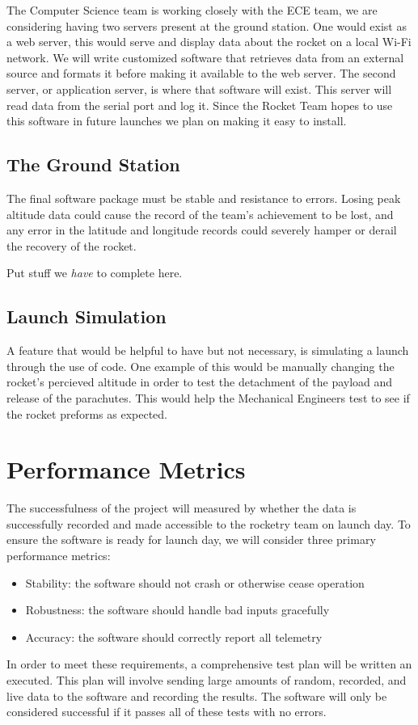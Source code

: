 \documentclass[10pt,journal,draftclsnofoot,onecolumn]{IEEEtran}
\begin{document}
The Computer Science team is 
working closely with the ECE team, we are considering having two servers 
present at the ground station. One would exist as a web server, this would
serve and display data about the rocket on a local Wi-Fi network. We will
write customized software that retrieves data from an external source and
formats it before making it available to the web server. The second server,
 or application server, is where that software will exist. This server will
 read data from the serial port and log it. Since the Rocket Team hopes to 
 use this software in future launches we plan on making it easy to install.

\subsection{The Ground Station}

The final software package must be stable and resistance to errors.
Losing peak altitude data could cause the record of the team's
achievement to be lost, and any error in the latitude
and longitude records could severely hamper or derail
the recovery of the rocket.


Put stuff we \textit{have} to complete here.

\subsection{Launch Simulation}

A feature that would be helpful to have but not necessary, is simulating a launch
through the use of code. One example of this would be manually changing the rocket's 
percieved altitude in order to test the detachment of the payload and release of the
parachutes. This would help the Mechanical Engineers test to see if 
the rocket preforms as expected. 

\section{Performance Metrics}

The successfulness of the project will measured by whether the data
is successfully recorded and made accessible to the rocketry team
on launch day. To ensure the software is ready for launch day,
we will consider three primary performance metrics:

\begin{itemize}
\item Stability: the software should not crash or otherwise cease operation
\item Robustness: the software should handle bad inputs gracefully
\item Accuracy: the software should correctly report all telemetry
\end{itemize}

In order to meet these requirements, a comprehensive test plan will
be written an executed. This plan will involve sending large amounts
of random, recorded, and live data to the software and recording the results.
The software will only be considered successful if it passes all of these
tests with no errors.
\end{document}
